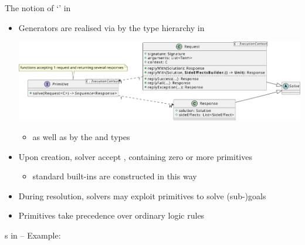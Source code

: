 \documentclass[presentation]{beamer}\mode<presentation>{\usetheme{AMSBolognaFC}}
\begin{document}
\begin{frame}[allowframebreaks]{The notion of `' in \twopkt{}}
    \begin{itemize}
        \item Generators are realised via by the  type hierarchy in \twopkt{}
        \begin{center}
            \includegraphics[width=\linewidth]{figures/primitive.pdf}
        \end{center}
        \begin{itemize}
            \item as well as by the  and  types
        \end{itemize}

        \framebreak

        \item Upon creation, solver accept , containing zero or more primitives
        \begin{itemize}
            \item standard built-ins are constructed in this way
        \end{itemize}

        \bigskip

        \item During resolution, solvers may exploit primitives to solve (sub-)goals 
        
        \bigskip

        \item Primitives take precedence over ordinary logic rules
    \end{itemize}
\end{frame}

\begin{frame}{s in \twopkt{} -- Example: }
\end{frame}
\end{document}
